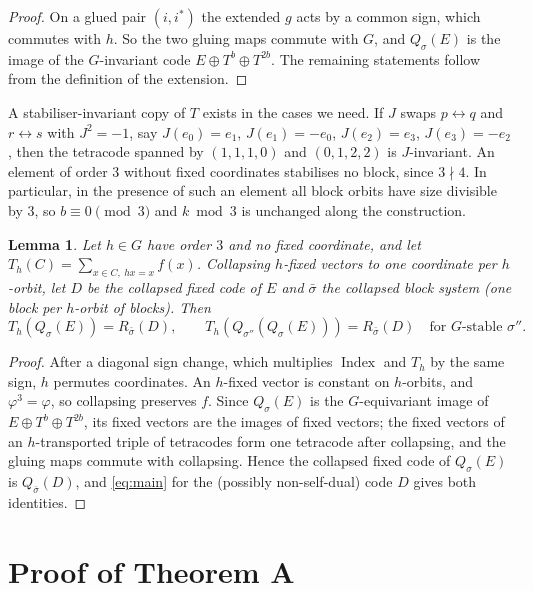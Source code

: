 \documentclass[11pt]{amsart}
\newtheorem{lemma}[theorem]{Lemma}
\theoremstyle{definition}
\newcommand{\Index}{\operatorname{Index}}
\begin{document}
\begin{proof}
On a glued pair $(i,i^*)$ the extended $g$ acts by a common sign, which commutes with $h$. So the
two gluing maps commute with $G$, and $Q_\sigma(E)$ is the image of the $G$-invariant code
$E\oplus T^b\oplus T^{2b}$. The remaining statements follow from the definition of the extension.
\end{proof}

A stabiliser-invariant copy of $T$ exists in the cases we need. If $J$ swaps $p\leftrightarrow q$
and $r\leftrightarrow s$ with $J^2=-1$, say $J(e_0)=e_1$, $J(e_1)=-e_0$, $J(e_2)=e_3$,
$J(e_3)=-e_2$, then the tetracode spanned by $(1,1,1,0)$ and $(0,1,2,2)$ is $J$-invariant. An element
of order $3$ without fixed coordinates stabilises no block, since $3\nmid4$. In particular, in
the presence of such an element all block orbits have size divisible by $3$, so $b\equiv0\pmod3$
and $k\bmod 3$ is unchanged along the construction.

\begin{lemma}\label{lem:fix}
Let $h\in G$ have order $3$ and no fixed coordinate, and let $T_h(C)=\sum_{x\in C,\ hx=x}f(x)$.
Collapsing $h$-fixed vectors to one coordinate per $h$-orbit, let $D$ be the collapsed fixed code of
$E$ and $\bar\sigma$ the collapsed block system (one block per $h$-orbit of blocks). Then
\[
T_h(Q_\sigma(E))=R_{\bar\sigma}(D),\qquad
T_h(Q_{\sigma''}(Q_\sigma(E)))=R_{\bar\sigma}(D)\quad\text{for $G$-stable $\sigma''$.}
\]
\end{lemma}

\begin{proof}
After a diagonal sign change, which multiplies $\Index$ and $T_h$ by the same sign, $h$ permutes
coordinates. An $h$-fixed vector is constant on $h$-orbits, and $\varphi^3=\varphi$, so collapsing
preserves $f$. Since $Q_\sigma(E)$ is the $G$-equivariant image of $E\oplus T^b\oplus T^{2b}$, its
fixed vectors are the images of fixed vectors; the fixed vectors of an $h$-transported triple of
tetracodes form one tetracode after collapsing, and the gluing maps commute with collapsing. Hence
the collapsed fixed code of $Q_\sigma(E)$ is $Q_{\bar\sigma}(D)$, and \eqref{eq:main} for the
(possibly non-self-dual) code $D$ gives both identities.
\end{proof}

\section{Proof of Theorem A}
\end{document}
